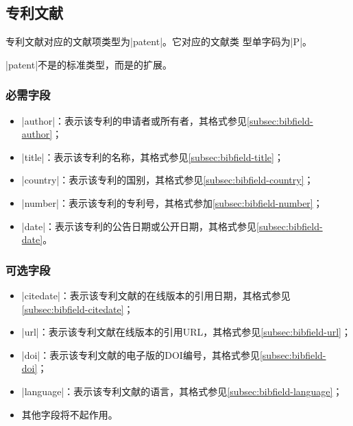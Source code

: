 
\subsection{专利文献}\label{subsec:bibtype-patent}

专利文献对应的{\BibTeX}文献项类型为|patent|。它对应的文献类
型单字码为|P|\cite{gbt3469-1983}。

|patent|不是{\BibTeX}的标准类型，而是{\njuthesis}的扩展。

\subsubsection{必需字段}

\begin{itemize}
\item |author|：表示该专利的申请者或所有者，其格式参见\ref{subsec:bibfield-author}；
\item |title|：表示该专利的名称，其格式参见\ref{subsec:bibfield-title}；
\item |country|：表示该专利的国别，其格式参见\ref{subsec:bibfield-country}；
\item |number|：表示该专利的专利号，其格式参加\ref{subsec:bibfield-number}；
\item |date|：表示该专利的公告日期或公开日期，其格式参见\ref{subsec:bibfield-date}。
\end{itemize}

\subsubsection{可选字段}

\begin{itemize}
\item |citedate|：表示该专利文献的在线版本的引用日期，其格式参见\ref{subsec:bibfield-citedate}；
\item |url|：表示该专利文献在线版本的引用URL，其格式参见\ref{subsec:bibfield-url}；
\item |doi|：表示该专利文献的电子版的DOI编号，其格式参见\ref{subsec:bibfield-doi}；
\item |language|：表示该专利文献的语言，其格式参见\ref{subsec:bibfield-language}；
\item 其他字段将不起作用。
\end{itemize}

